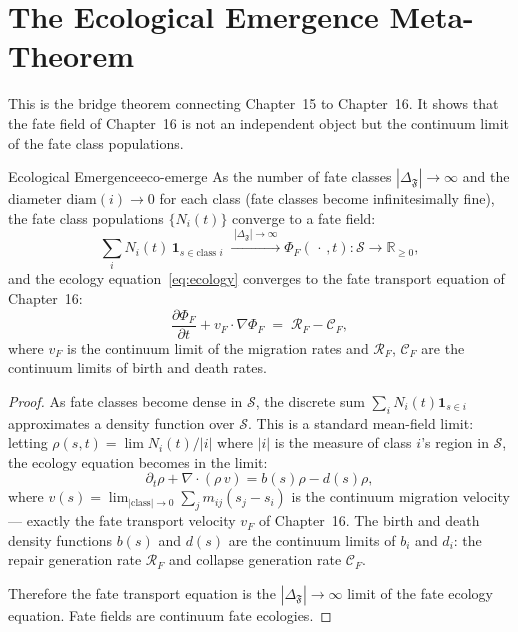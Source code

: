 \documentclass[12pt,twoside,openright]{book}
\newcommand{\fateClasses}{\Delta_{\mathfrak{F}}}
\newcommand{\fateSpace}{\mathcal{S}}
\providecommand{\fateClasses}{\Delta_{\mathfrak{F}}}
\providecommand{\fateField}{\Phi_{F}}
\providecommand{\fateVelField}{v_{F}}
\begin{document}
\section{The Ecological Emergence Meta-Theorem}

This is the bridge theorem connecting Chapter~15 to Chapter~16.
It shows that the fate field of Chapter~16 is not an independent
object but the continuum limit of the fate class populations.

\begin{metatheorem}{Ecological Emergence}{eco-emerge}
As the number of fate classes $|\fateClasses|\to\infty$ and
the diameter $\mathrm{diam}(i)\to 0$ for each class
(fate classes become infinitesimally fine), the fate class
populations $\{N_i(t)\}$ converge to a fate field:
\[
  \sum_i N_i(t)\,\mathbf{1}_{s\in\text{class }i}
  \;\xrightarrow{\;|\fateClasses|\to\infty\;}
  \fateField(\,\cdot\,,t):\fateSpace\to\mathbb{R}_{\ge0},
\]
and the ecology equation~\eqref{eq:ecology} converges to
the fate transport equation of Chapter~16:
\[
  \frac{\partial\fateField}{\partial t}
  + \fateVelField\cdot\nabla\fateField
  \;=\;
  \mathcal{R}_{F} - \mathcal{C}_{F},
\]
where $\fateVelField$ is the continuum limit of the migration
rates and $\mathcal{R}_{F}$, $\mathcal{C}_{F}$
are the continuum limits of birth and death rates.
\begin{proof}
As fate classes become dense in $\fateSpace$, the discrete
sum $\sum_i N_i(t)\mathbf{1}_{s\in i}$ approximates a
density function over $\fateSpace$. This is a standard
mean-field limit: letting $\rho(s,t)=\lim N_i(t)/|i|$ where
$|i|$ is the measure of class $i$'s region in $\fateSpace$,
the ecology equation becomes in the limit:
\[
  \partial_t\rho + \nabla\cdot(\rho\, v)
  = b(s)\rho - d(s)\rho,
\]
where $v(s)=\lim_{|\text{class}|\to 0}\sum_j m_{ij}(s_j-s_i)$
is the continuum migration velocity --- exactly the fate
transport velocity $\fateVelField$ of Chapter~16. The
birth and death density functions $b(s)$ and $d(s)$ are
the continuum limits of $b_i$ and $d_i$: the repair
generation rate $\mathcal{R}_{F}$ and collapse
generation rate $\mathcal{C}_{F}$.

Therefore the fate transport equation is the
$|\fateClasses|\to\infty$ limit of the fate ecology equation.
Fate fields are continuum fate ecologies.
\end{proof}
\end{metatheorem}
\end{document}
